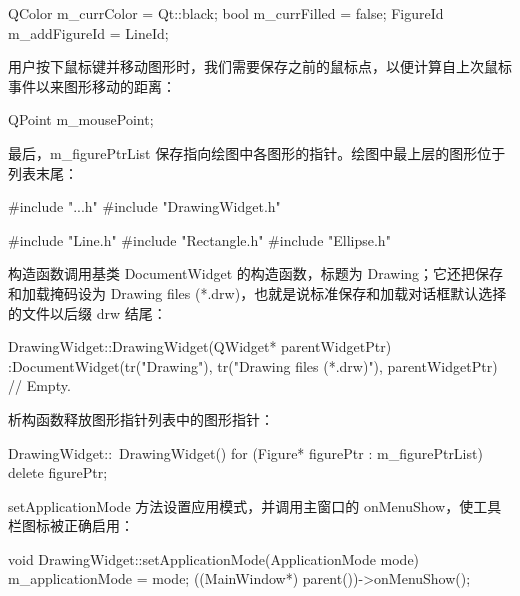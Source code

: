 \begin{codebox}
    QColor m_currColor = Qt::black;
    bool m_currFilled = false;
    FigureId m_addFigureId = LineId;
\end{codebox}

用户按下鼠标键并移动图形时，我们需要保存之前的鼠标点，以便计算自上次鼠标事件以来图形移动的距离：

\begin{codebox}
    QPoint m_mousePoint;
\end{codebox}

最后，m\_figurePtrList 保存指向绘图中各图形的指针。绘图中最上层的图形位于列表末尾：

\begin{codebox}
    QList<Figure*> m_figurePtrList;
  };

#endif // DRAWINGWIDGET_H
\end{codebox}

\medskip{}

\begin{codebox}
#include "..\MainWindow\DocumentWidget.h"
#include "DrawingWidget.h"

#include "Line.h"
#include "Rectangle.h"
#include "Ellipse.h"
\end{codebox}

构造函数调用基类 DocumentWidget 的构造函数，标题为 Drawing；它还把保存和加载掩码设为 Drawing files (*.drw)，也就是说标准保存和加载对话框默认选择的文件以后缀 drw 结尾：

\begin{codebox}
DrawingWidget::DrawingWidget(QWidget* parentWidgetPtr)
 :DocumentWidget(tr("Drawing"), tr("Drawing files (*.drw)"),
                 parentWidgetPtr) {
  // Empty.
}
\end{codebox}

析构函数释放图形指针列表中的图形指针：

\begin{codebox}
DrawingWidget::~DrawingWidget() {
  for (Figure* figurePtr : m_figurePtrList) {
    delete figurePtr;
  }
}
\end{codebox}

setApplicationMode 方法设置应用模式，并调用主窗口的 onMenuShow，使工具栏图标被正确启用：

\begin{codebox}
void DrawingWidget::setApplicationMode(ApplicationMode mode) {
  m_applicationMode = mode;
  ((MainWindow*) parent())->onMenuShow();
}
\end{codebox}

